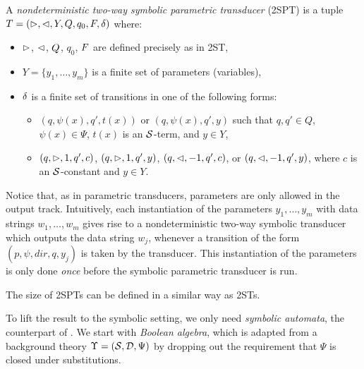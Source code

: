 

\begin{definition}
A \emph{nondeterministic two-way symbolic parametric transducer} (2SPT) is a tuple
$T=(\vartriangleright, \vartriangleleft, Y, Q, q_0, F, \delta)$ where:
\begin{itemize}
%
\item $\vartriangleright$, $\vartriangleleft$, $Q$, $q_0$, $F$ are defined precisely as in 2ST, 
%
\item $Y=\{y_1,\ldots, y_m\}$ is a finite set of parameters (variables), 
%
\item $\delta$ is a finite set of transitions in one of the following forms: 
\begin{itemize}
\item $(q, \psi(x), q', t(x))$ or $(q, \psi(x), q', y)$ such that $q,q' \in Q$, $\psi(x) \in \Psi$,
$t(x)$ is an $\mathcal{S}$-term, and $y \in Y$,
%
\item $(q, \vartriangleright, 1, q', c)$, $(q, \vartriangleright, 1, q', y)$, $(q, \vartriangleleft, -1, q', c)$,  or $(q, \vartriangleleft, -1, q', y)$, where $c$ is an $\mathcal{S}$-constant and $y \in Y$. 
\end{itemize}
\end{itemize}
\end{definition}

Notice that, as in parametric transducers, parameters are only allowed in the output track.
Intuitively, each instantiation of the parameters $y_1,\ldots, y_m$ with data strings 
$w_1,\ldots, w_m$ gives rise to a nondeterministic two-way symbolic transducer which outputs
the data string $w_j$, whenever a transition of the form $(p, \psi, dir, q, y_j)$ is
taken by the transducer. This instantiation of the parameters is only done 
\emph{once} before the symbolic parametric transducer is run.

The size of 2SPTs can be defined in a similar way as 2STs. 

To lift the result to the symbolic setting, we only need  \emph{symbolic automata}, the counterpart of \FA. We start with \emph{Boolean algebra}, 
which is adapted from a background theory $\Upsilon=(\mathcal{S},\mathcal{D}, \Psi)$ by dropping out the requirement that $\Psi$ is closed under substitutions.


